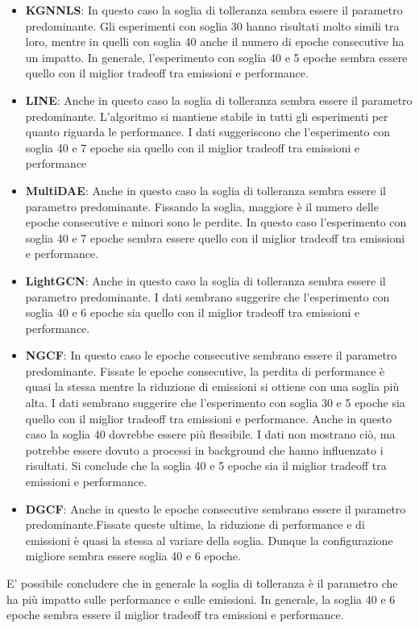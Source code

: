 \begin{itemize}
    \item \textbf{KGNNLS}: In questo caso la soglia di tolleranza sembra essere il parametro predominante. Gli esperimenti con soglia 30 hanno risultati molto simili tra loro, mentre in quelli con soglia 40 anche il numero di epoche consecutive ha un impatto. In generale, l'esperimento con soglia 40 e 5 epoche sembra essere quello con il miglior tradeoff tra emissioni e performance.
    \item \textbf{LINE}: Anche in questo caso la soglia di tolleranza sembra essere il parametro predominante. L'algoritmo si mantiene stabile in tutti gli esperimenti per quanto riguarda le performance. I dati suggeriscono che l'esperimento con soglia 40 e 7 epoche sia quello con il miglior tradeoff tra emissioni e performance
    \item \textbf{MultiDAE}: Anche in questo caso la soglia di tolleranza sembra essere il parametro predominante. Fissando la soglia, maggiore è il numero delle epoche consecutive e minori sono le perdite. In questo caso l'esperimento con soglia 40 e 7 epoche sembra essere quello con il miglior tradeoff tra emissioni e performance.
    \item \textbf{LightGCN}: Anche in questo caso la soglia di tolleranza sembra essere il parametro predominante. I dati sembrano suggerire che l'esperimento con soglia 40 e 6 epoche sia quello con il miglior tradeoff tra emissioni e performance.
    \item \textbf{NGCF}: In questo caso le epoche consecutive sembrano essere il parametro predominante. Fissate le epoche consecutive, la perdita di performance è quasi la stessa mentre la riduzione di emissioni si ottiene con una soglia più alta. I dati sembrano suggerire che l'esperimento con soglia 30 e 5 epoche sia quello con il miglior tradeoff tra emissioni e performance. Anche in questo caso la soglia 40 dovrebbe essere più flessibile. I dati non mostrano ciò, ma potrebbe essere dovuto a processi in background che hanno influenzato i risultati. Si conclude che la soglia 40 e 5 epoche sia il miglior tradeoff tra emissioni e performance.
    \item \textbf{DGCF}: Anche in questo le epoche consecutive sembrano essere il parametro predominante.Fissate queste ultime, la riduzione di performance e di emissioni è quasi la stessa al variare della soglia. Dunque la configurazione migliore sembra essere soglia 40 e 6 epoche.
\end{itemize}

\noindent E' possibile concludere che in generale la soglia di tolleranza è il parametro che ha più impatto sulle performance e sulle emissioni. In generale, la soglia 40 e 6 epoche sembra essere il miglior tradeoff tra emissioni e performance.\\
